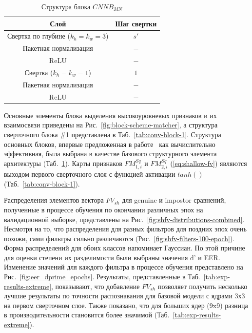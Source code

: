 \begin{table}[h]
	\begin{center}
		\begin{tabular}{|c|c|}
			\hline
			\textbf{Слой}					&\textbf{Шаг свертки} \\
			\hline
			Свертка по глубине ($k_h=k_w=3$) 	&	$s'$\\
			Пакетная нормализация			&	$-$\\
			ReLU							& 	$-$\\
			Свертка ($k_h=k_w=1$) 			& 	$1$\\
			Пакетная нормализация			&	$-$\\
			ReLU							& 	$-$\\
			\hline
		\end{tabular}
		\caption{Структура блока $CNNB_{MN}$}
		\label{tab:dwscblock}
	\end{center}
\end{table}

Основные элементы блока выделения высокоуровневых признаков и их взаимосвязи приведены на Рис.~\ref{fig:block-scheme-matcher}, а структура сверточного блока \#1 представлена в Таб.~\ref{tab:conv-block-1}. Структура основных блоков, впервые предложенная в работе~\cite{howard_2017} как вычислительно эффективная, была выбрана в качестве базового структурного элемента архитектуры (Таб.~\ref{tab:dwscblock}). Карты признаков $FM^{Sq}_{1, i}$ и $FM^{Sq}_{2,i}$ (\ref{eq:shallow-fv}) являются выходом первого сверточного слоя с функцией активации $tanh()$ (Таб.~\ref{tab:conv-block-1}).

Распределения элементов вектора $FV_{sh}$ для genuine и impostor сравнений, полученные в процессе обучения по окончании различных эпох на валидационной выборке, представлены на Рис.~\ref{fig:shfv-distributions-combined}. Несмотря на то, что распределения для разных фильтров для поздних эпох очень похожи, сами фильтры сильно различаются (Рис.~\ref{fig:shfv-filters-100-epoch}). Форма распределений для обоих классов напоминает Гауссиан. По этой причине для оценки степени их разделимости были выбраны значения d' и EER. Изменение значений для каждого фильтра в процессе обучения представлено на Рис.~\ref{fig:eer_dprime_epochs}. Результаты, представленные в Таб.~\ref{tab:exp-results-extreme}, показывают, что добавление $FV_{sh}$ позволяет получить несколько лучшие результаты по точности распознавания для базовой модели с ядрами 3х3 на первом сверточном слое. Также показано, что для больших ядер (9x9) разница в производительности становится более значимой (Таб.~\ref{tab:exp-results-extreme}).


